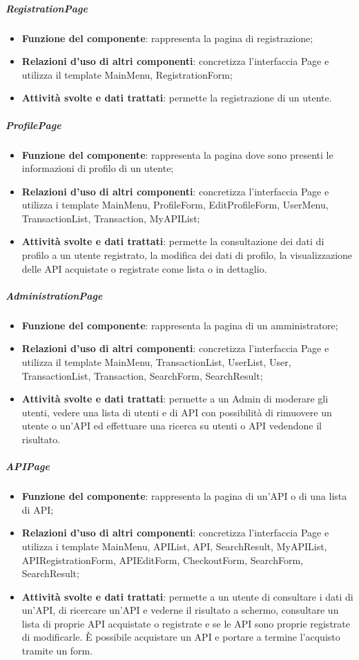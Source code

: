 \subparagraph{RegistrationPage}
\begin{itemize}
	\item \textbf{Funzione del componente}: rappresenta la pagina di registrazione;
	\item \textbf{Relazioni d’uso di altri componenti}: concretizza l'interfaccia Page e utilizza il template MainMenu, RegistrationForm;
	\item \textbf{Attività svolte e dati trattati}: permette la registrazione di un utente.
\end{itemize}

\subparagraph{ProfilePage}
\begin{itemize}
	\item \textbf{Funzione del componente}: rappresenta la pagina dove sono presenti le informazioni di profilo di un utente;
	\item \textbf{Relazioni d’uso di altri componenti}: concretizza l'interfaccia Page e utilizza i template MainMenu, ProfileForm, EditProfileForm, UserMenu, TransactionList, Transaction, MyAPIList;
	\item \textbf{Attività svolte e dati trattati}: permette la consultazione dei dati di profilo a un utente registrato, la modifica dei dati di profilo, la visualizzazione delle API acquistate o registrate come lista o in dettaglio.
\end{itemize}

\subparagraph{AdministrationPage}
\begin{itemize}
	\item \textbf{Funzione del componente}: rappresenta la pagina di un amministratore;
	\item \textbf{Relazioni d’uso di altri componenti}: concretizza l'interfaccia Page e utilizza il template MainMenu, TransactionList, UserList, User, TransactionList, Transaction, SearchForm, SearchResult;
	\item \textbf{Attività svolte e dati trattati}: permette a un Admin di moderare gli utenti, vedere una lista di utenti e di API con possibilit\`{a} di rimuovere un utente o un'API ed effettuare una ricerca su utenti o API vedendone il risultato.
\end{itemize}

\subparagraph{APIPage}
\begin{itemize}
	\item \textbf{Funzione del componente}: rappresenta la pagina di un'API o di una lista di API;
	\item \textbf{Relazioni d’uso di altri componenti}: concretizza l'interfaccia Page e utilizza i template MainMenu, APIList, API, SearchResult, MyAPIList, APIRegistrationForm, APIEditForm, CheckoutForm, SearchForm, SearchResult;
	\item \textbf{Attività svolte e dati trattati}: permette a un utente di consultare i dati di un'API, di ricercare un'API e vederne il risultato a schermo, consultare un lista di proprie API acquistate o registrate e se le API sono proprie registrate di modificarle. \`{E} possibile acquistare un API e portare a termine l'acquisto tramite un form.
\end{itemize}

